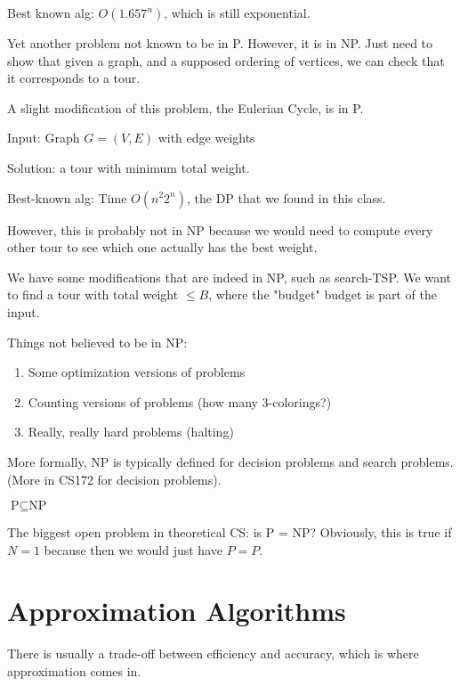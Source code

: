 \documentclass{article}
\begin{document}
    Best known alg: $O(1.657^n)$, which is still exponential.

    Yet another problem not known to be in P. However, it is in NP. Just need to show that given a graph, and a supposed ordering of vertices, we can check that it corresponds to a tour.

    A slight modification of this problem, the Eulerian Cycle, is in P.

    \begin{ex}
        Input: Graph $G = (V, E)$ with edge weights

        Solution: a tour with minimum total weight.
    \end{ex}

    Best-known alg: Time $O(n^2 2^n)$, the DP that we found in this class.

    However, this is probably not in NP because we would need to compute every other tour to see which one actually has the best weight.

    We have some modifications that are indeed in NP, such as search-TSP. We want to find a tour with total weight $\leq B$, where the "budget" budget is part of the input.

    Things not believed to be in NP:
    \begin{enumerate}
        \item Some optimization versions of problems
        \item Counting versions of problems  (how many 3-colorings?)
        \item Really, really hard problems (halting)
    \end{enumerate}

    More formally, NP is typically defined for decision problems and search problems. (More in CS172 for decision problems).

    \begin{thm}
        $\text{P} \subseteq \text{NP}$
    \end{thm}

    The biggest open problem in theoretical CS: is P = NP? Obviously, this is true if $N = 1$ because then we would just have $P = P$.

    \section{Approximation Algorithms}
    There is usually a trade-off between efficiency and accuracy, which is where approximation comes in. 
\end{document}
